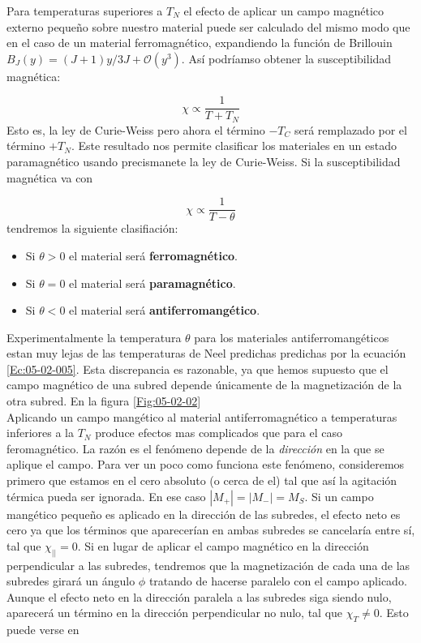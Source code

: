 \documentclass[12pt,a4paper]{book}
\numberwithin{equation}{section}
\numberwithin{figure}{section}
\begin{document}
Para temperaturas superiores a $T_N$ el efecto de aplicar un campo magnético externo pequeño sobre nuestro material puede ser calculado del mismo modo que en el caso de un material ferromagnético, expandiendo la función de Brillouin $B_J(y)=(J+1)y/3J + \mathcal{O}(y^3)$. Así podríamso obtener la susceptibilidad magnética:

\begin{equation}
    \chi \varpropto \frac{1}{T+T_N}
\end{equation}
Esto es, la ley de Curie-Weiss pero ahora el término $-T_C$ será remplazado por el término $+T_N$. Este resultado nos permite clasificar los materiales en un estado paramagnético usando precismanete la ley de Curie-Weiss. Si la susceptibilidad magnética va con 

\begin{equation}
    \chi \varpropto \frac{1}{T - \theta}
\end{equation}
tendremos la siguiente clasifiación: 
\begin{itemize}
    \item Si $\theta>0$ el material será \textbf{ferromagnético}. 
    
    \item Si $\theta=0$ el material será \textbf{paramagnético}.
    
    \item Si $\theta<0$ el material será \textbf{antiferromangético}. 
\end{itemize} 

Experimentalmente la temperatura $\theta$ para los materiales antiferromangéticos estan muy lejas de las temperaturas de Neel predichas predichas por la ecuación \ref{Ec:05-02-005}. Esta discrepancia es razonable, ya que hemos supuesto que el campo magnético de una subred depende únicamente de la magnetización de la otra subred. En la figura \ref{Fig:05-02-02} \\


Aplicando un campo mangético al material antiferromagnético a temperaturas inferiores a la $T_N$ produce efectos mas complicados que para el caso feromagnético. La razón es el fenómeno depende de la  \textit{dirección} en la que se aplique el campo. Para ver un poco como funciona este fenómeno, consideremos primero que estamos en el cero absoluto (o cerca de el) tal que así la agitación térmica pueda ser ignorada. En ese caso $|M_+|=|M_-|=M_S$. Si un campo mangético pequeño es aplicado en la dirección de las subredes, el efecto neto es cero ya que los términos que aparecerían en ambas subredes se cancelaría entre sí, tal que $\chi_{||} = 0$. Si en lugar de aplicar el campo magnético en la dirección perpendicular a las subredes, tendremos que la magnetización de cada una de las subredes girará un ángulo $\phi$ tratando de hacerse paralelo con el campo aplicado. Aunque el efecto neto en la dirección paralela a las subredes siga siendo nulo, aparecerá un término en la dirección perpendicular no nulo, tal que $\chi_T \neq 0$. Esto puede verse en \\
\end{document}
